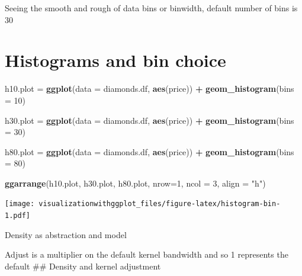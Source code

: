\documentclass[]{krantz}
\makeatletter
\newenvironment{Shaded}{\begin{snugshade}}{\end{snugshade}}
\newcommand{\KeywordTok}[1]{\textcolor[rgb]{0.13,0.29,0.53}{\textbf{#1}}}
\newcommand{\DataTypeTok}[1]{\textcolor[rgb]{0.13,0.29,0.53}{#1}}
\newcommand{\DecValTok}[1]{\textcolor[rgb]{0.00,0.00,0.81}{#1}}
\newcommand{\StringTok}[1]{\textcolor[rgb]{0.31,0.60,0.02}{#1}}
\newcommand{\OperatorTok}[1]{\textcolor[rgb]{0.81,0.36,0.00}{\textbf{#1}}}
\newcommand{\NormalTok}[1]{#1}
\newenvironment{kframe}{%
\medskip{}
\setlength{\fboxsep}{.8em}
 \def\at@end@of@kframe{}%
 \ifinner\ifhmode%
  \def\at@end@of@kframe{\end{minipage}}%
  \begin{minipage}{\columnwidth}%
 \fi\fi%
 \def\FrameCommand##1{\hskip\@totalleftmargin \hskip-\fboxsep
 \colorbox{shadecolor}{##1}\hskip-\fboxsep
     \hskip-\linewidth \hskip-\@totalleftmargin \hskip\columnwidth}%
 \MakeFramed {\advance\hsize-\width
   \@totalleftmargin\z@ \linewidth\hsize
   \@setminipage}}%
 {\par\unskip\endMakeFramed%
 \at@end@of@kframe}
\renewenvironment{Shaded}{\begin{kframe}}{\end{kframe}}
\theoremstyle{definition}
\theoremstyle{definition}
\theoremstyle{definition}
\theoremstyle{remark}
\makeatother
\begin{document}
Seeing the smooth and rough of data bins or binwidth, default number of
bins is 30

\section{Histograms and bin choice}\label{histograms-and-bin-choice}

\begin{Shaded}
\begin{Highlighting}[]
\NormalTok{h10.plot =}\StringTok{ }\KeywordTok{ggplot}\NormalTok{(}\DataTypeTok{data =}\NormalTok{ diamonds.df, }\KeywordTok{aes}\NormalTok{(price)) }\OperatorTok{+}\StringTok{ }
\StringTok{  }\KeywordTok{geom_histogram}\NormalTok{(}\DataTypeTok{bins =} \DecValTok{10}\NormalTok{) }

\NormalTok{h30.plot =}\StringTok{ }\KeywordTok{ggplot}\NormalTok{(}\DataTypeTok{data =}\NormalTok{ diamonds.df, }\KeywordTok{aes}\NormalTok{(price)) }\OperatorTok{+}\StringTok{ }
\StringTok{  }\KeywordTok{geom_histogram}\NormalTok{(}\DataTypeTok{bins =} \DecValTok{30}\NormalTok{) }

\NormalTok{h80.plot =}\StringTok{ }\KeywordTok{ggplot}\NormalTok{(}\DataTypeTok{data =}\NormalTok{ diamonds.df, }\KeywordTok{aes}\NormalTok{(price)) }\OperatorTok{+}\StringTok{ }
\StringTok{  }\KeywordTok{geom_histogram}\NormalTok{(}\DataTypeTok{bins =} \DecValTok{80}\NormalTok{) }

\KeywordTok{ggarrange}\NormalTok{(h10.plot, h30.plot, h80.plot,}
    \DataTypeTok{nrow=}\DecValTok{1}\NormalTok{, }\DataTypeTok{ncol =} \DecValTok{3}\NormalTok{, }\DataTypeTok{align =} \StringTok{"h"}\NormalTok{)}
\end{Highlighting}
\end{Shaded}

\texttt{[image: visualizationwithggplot\_files/figure-latex/histogram-bin-1.pdf]}

Density as abstraction and model

Adjust is a multiplier on the default kernel bandwidth and so 1
represents the default \#\# Density and kernel adjustment
\end{document}
